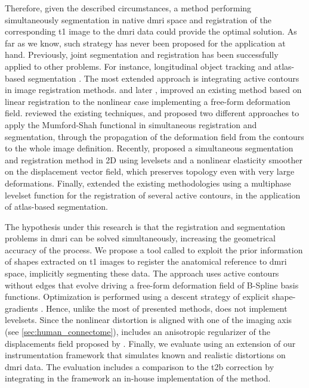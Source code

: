 Therefore, given the described circumstances, a method performing simultaneously
  segmentation in native \gls*{dmri} space and registration of the corresponding \gls*{t1} image
  to the \gls*{dmri} data could provide the optimal solution.
As far as we know, such strategy has never been proposed for the application at hand.
Previously, joint segmentation and registration has been successfully applied to other problems.
For instance, longitudinal object tracking \citep{paragios_level_2003} and atlas-based
  segmentation \citep{gorthi_active_2011}.
The most extended approach is integrating active contours in image registration 
  methods.
\cite{unal_coupled_2005} and later \cite{wang_joint_2006},
  improved an existing method \citep{yezzi_variational_2003} based on linear registration
  to the nonlinear case implementing a free-form deformation field.
\cite{droske_mumfordshah_2009} reviewed the existing techniques, and proposed two different
  approaches to apply the Mumford-Shah functional \citep{mumford_optimal_1989} in simultaneous
  registration and segmentation, through the propagation of the deformation field from
  the contours to the whole image definition.
Recently, \cite{guyader_combined_2011} proposed a simultaneous segmentation and
  registration method in 2D using levelsets and a nonlinear elasticity smoother on the
  displacement vector field, which preserves topology even with very large deformations.
Finally, \cite{gorthi_active_2011} extended the existing methodologies using a multiphase
  levelset function for the registration of several active contours, in the application
  of atlas-based segmentation.
  
The hypothesis under this research is that the registration and segmentation
  problems in \gls*{dmri} can be solved simultaneously, increasing the geometrical
  accuracy of the process.
We propose a tool called \regseg{} to exploit the prior information of shapes
  extracted on \gls*{t1} images to register the anatomical reference
  to \gls*{dmri} space, implicitly segmenting these data.
The approach uses active contours without edges \citep{chan_active_2001} that evolve driving a
  free-form deformation field of B-Spline basis functions.
Optimization is performed using a descent strategy of explicit shape-gradients
  \citep{besson_dream2s_2003,herbulot_segmentation_2006}.
Hence, unlike the most of presented methods, \regseg{} does not implement levelsets.
Since the nonlinear distortion is aligned with one of the imaging axis (see 
  \autoref{sec:human_connectome}), \regseg{} includes an anisotropic regularizer of
  the displacements field proposed by \cite{nagel_investigation_1986}.
Finally, we evaluate \regseg{} using an extension of our instrumentation framework
  \citep{esteban_simulationbased_2014} that simulates known and realistic distortions
  on \gls*{dmri} data.
The evaluation includes a comparison to the \gls*{t2b} correction by integrating in the framework
  an in-house implementation of the method.
